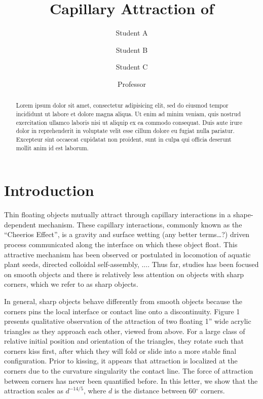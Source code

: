 \documentclass[twocolumn,prl]{revtex4-1}
\begin{document}
\title{Capillary Attraction of }
\author{Student A}
\author{Student B}
\author{Student C}
\author{Professor}

\begin{abstract}
	Lorem ipsum dolor sit amet, consectetur adipisicing elit, sed do eiusmod tempor incididunt ut labore et dolore magna aliqua. Ut enim ad minim veniam, quis nostrud exercitation ullamco laboris nisi ut aliquip ex ea commodo consequat. Duis aute irure dolor in reprehenderit in voluptate velit esse cillum dolore eu fugiat nulla pariatur. Excepteur sint occaecat cupidatat non proident, sunt in culpa qui officia deserunt mollit anim id est laborum.
\end{abstract}

\maketitle

\section{Introduction}
	
	Thin floating objects mutually attract through capillary interactions in a shape-dependent mechanism. These capillary interactions, commonly known as the “Cheerios Effect”, is a gravity and surface wetting (any better terms…?) driven process communicated along the interface on which these object float.  This attractive mechanism has been observed or postulated in locomotion of aquatic plant seeds\cite{peruzzo2013capillary}, directed colloidal self-assembly\cite{fan2004assembly}, .... Thus far, studies has been focused on smooth objects and there is relatively less attention on objects with sharp corners, which we refer to as sharp objects. 
	
	In general, sharp objects behave differently from smooth objects because the corners pins the local interface or contact line onto a discontinuity. Figure 1 presents qualitative observation of the attraction of two floating 1'' wide acrylic triangles as they approach each other, viewed from above. For a large class of relative initial position and orientation of the triangles, they rotate such that corners kiss first, after which they will fold or slide into a more stable final configuration. Prior to kissing, it appears that attraction is localized at the corners due to the curvature singularity  the contact line. The force of attraction between corners has never been quantified before. In this letter, we show that the attraction scales as $d^{-14/5}$, where $d$ is the distance between 60$^{\circ}$ corners. %
\end{document}
